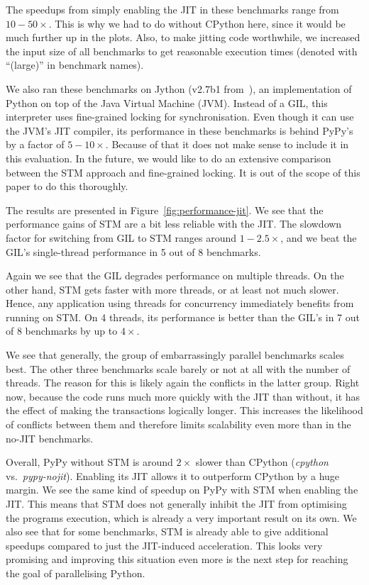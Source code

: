 \documentclass{sigplanconf}
\begin{document}
The speedups from simply enabling the JIT in these benchmarks range from
$10-50\times$. This is why we had to do without CPython here, since it
would be much further up in the plots. Also, to make jitting
code worthwhile, we increased the input size of all benchmarks to get
reasonable execution times (denoted with ``(large)'' in benchmark names).

We also ran these benchmarks on Jython (v2.7b1 from~\cite{webjython}),
an implementation of Python on top of the
Java Virtual Machine (JVM).  Instead of a GIL, this interpreter uses
fine-grained locking for synchronisation. Even though it can use the
JVM's JIT compiler, its performance in these benchmarks is behind
PyPy's by a factor of $5-10\times$. Because of that it does not
make sense to include it in this evaluation. In the future, we would
like to do an extensive comparison between the STM approach and
fine-grained locking. It is out of the scope of this paper to do
this thoroughly.

The results are presented in Figure~\ref{fig:performance-jit}. We see
that the performance gains of STM are a bit less reliable with the JIT.
The slowdown factor for switching from GIL to STM ranges around
$1-2.5\times$, and we beat the GIL's single-thread performance in
5 out of 8 benchmarks.

Again we see that the GIL degrades performance on multiple threads.
On the other hand, STM gets faster with more threads, or at least
not much slower. Hence, any application using threads for concurrency
immediately benefits from running on STM. On 4 threads, its performance
is better than the GIL's in 7 out of 8 benchmarks by up to $4\times$.

We see that generally, the group of embarrassingly parallel benchmarks
scales best.  The other three benchmarks scale barely or not at all
with the number of threads. The reason for this is likely again the
conflicts in the latter group. Right now, because the code runs much
more quickly with the JIT than without, it has the effect of making
the transactions logically longer.  This increases the likelihood of
conflicts between them and therefore limits scalability even more than
in the no-JIT benchmarks.

Overall, PyPy without STM is around $2\times$ slower than CPython
(\emph{cpython} vs.\ \emph{pypy-nojit}).  Enabling its JIT allows it
to outperform CPython by a huge margin.  We see the same kind of
speedup on PyPy with STM when enabling the JIT. This means that STM
does not generally inhibit the JIT from optimising the programs
execution, which is already a very important result on its own. We
also see that for some benchmarks, STM is already able to give
additional speedups compared to just the JIT-induced
acceleration. This looks very promising and improving this situation
even more is the next step for reaching the goal of parallelising
Python.
\end{document}
